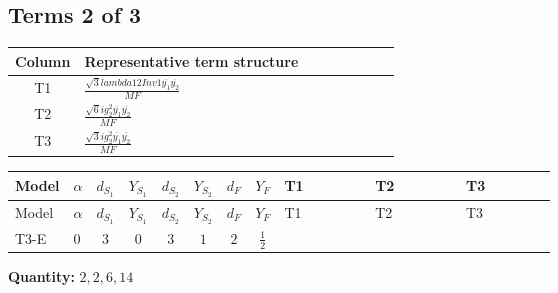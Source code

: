 \documentclass[8pt]{article}
\begin{document}
\begin{landscape}
\subsection*{Terms 2 of 3}
\begin{center}
\begin{tabular}{@{}c >{\raggedright\arraybackslash}p{0.82\linewidth}@{}}
\toprule
Column & Representative term structure \\
\midrule
T1 & \(\displaystyle \frac{\sqrt{3} lambda12Inv1 \overline{y_{1}} \overline{y_{2}}}{MF}\) \\
\midrule
T2 & \(\displaystyle \frac{\sqrt{6} i g_{2}^{2} \overline{y_{1}} \overline{y_{2}}}{MF}\) \\
\midrule
T3 & \(\displaystyle \frac{\sqrt{3} i g_{2}^{2} \overline{y_{1}} \overline{y_{2}}}{MF}\) \\
\midrule
\bottomrule
\end{tabular}
\end{center}
\smallskip
\tiny
\begin{longtable}{@{}llcccccc >{\raggedright\arraybackslash}p{0.21\linewidth} >{\raggedright\arraybackslash}p{0.21\linewidth} >{\raggedright\arraybackslash}p{0.21\linewidth}@{}}
\toprule
Model & $\alpha$ & $d_{S_1}$ & $Y_{S_1}$ & $d_{S_2}$ & $Y_{S_2}$ & $d_F$ & $Y_F$ & T1 & T2 & T3 \\
\midrule
\endfirsthead
\toprule
Model & $\alpha$ & $d_{S_1}$ & $Y_{S_1}$ & $d_{S_2}$ & $Y_{S_2}$ & $d_F$ & $Y_F$ & T1 & T2 & T3 \\
\midrule
\endhead
T3-E & $0$ & $3$ & $0$ & $3$ & $1$ & $2$ & $\frac{1}{2}$ & \scriptsize\adjustbox{max width=\linewidth}{$\begin{gathered} \frac{\sqrt{3} lambda12Inv1 \overline{y_{1}} \overline{y_{2}}}{6 MF}\end{gathered}$} & \scriptsize\adjustbox{max width=\linewidth}{$\begin{gathered} \frac{\sqrt{6} i g_{2}^{2} \overline{y_{1}} \overline{y_{2}}}{3 MF}\end{gathered}$} & \scriptsize\adjustbox{max width=\linewidth}{$\begin{gathered} \frac{\sqrt{3} i g_{2}^{2} \overline{y_{1}} \overline{y_{2}}}{6 MF}\end{gathered}$} \\
\midrule
\bottomrule
\end{longtable}
\clearpage
\noindent\textbf{Quantity: }$\mathrm{2,2,6,14}$\par\smallskip

\end{landscape}
\end{document}
